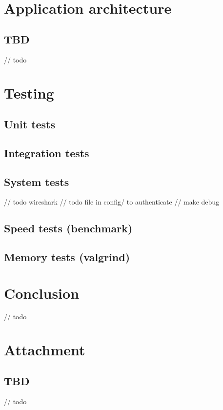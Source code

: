 \documentclass[a4paper, 11pt]{article}
\begin{document}
	\section{Application architecture}

	\subsection{TBD}
	// todo 

	\section{Testing}

	\subsection{Unit tests}
	\subsection{Integration tests}
	\subsection{System tests}
	// todo wireshark
	// todo file in config/ to authenticate
	// make debug
	\subsection{Speed tests (benchmark)}
	\subsection{Memory tests (valgrind)}

	\section{Conclusion}
	// todo


	\clearpage
	\appendix

	\section{Attachment}

	\subsection{TBD}
	// todo
	\newpage
\end{document}
